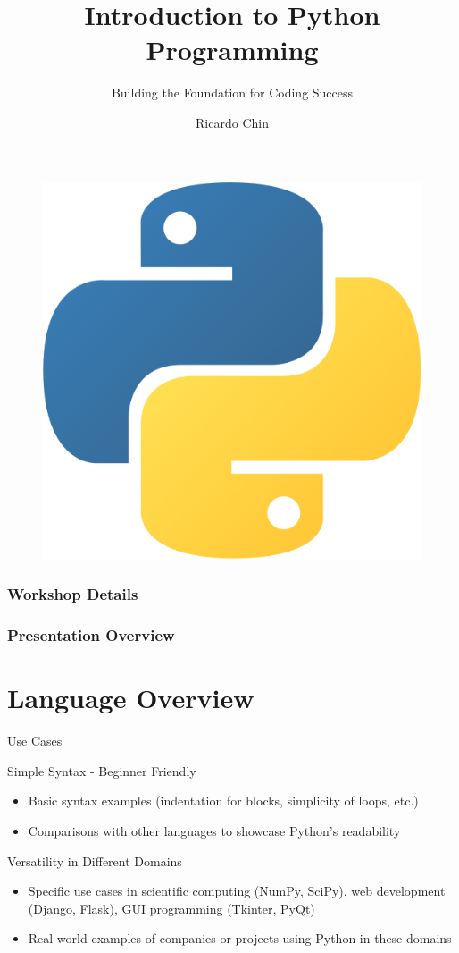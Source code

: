\documentclass[
	11pt, 
]{beamer}
\title[Python: Early Fundamentals]{Introduction to Python Programming}
\subtitle{Building the Foundation for Coding Success}
\author[Ricardo Chin]{Ricardo Chin}
\begin{document}
\begin{frame}
    \titlepage
    \begin{figure}
        \includegraphics[width=0.1\linewidth]{5848152fcef1014c0b5e4967}
    \end{figure}
    \frametitle{Workshop Details}
\end{frame}



\begin{frame}
	\frametitle{Presentation Overview}
	
	\tableofcontents
\end{frame}

\section{Language Overview}
\begin{frame}{Use Cases}
\begin{block}{Simple Syntax - Beginner Friendly}
\begin{itemize}
\item Basic syntax examples (indentation for blocks, simplicity of loops, etc.)
\item Comparisons with other languages to showcase Python's readability
\end{itemize}
\end{block}
\bigskip
\begin{block}{Versatility in Different Domains}
\begin{itemize}
\item Specific use cases in scientific computing (NumPy, SciPy), web development (Django, Flask), GUI programming (Tkinter, PyQt)
\item Real-world examples of companies or projects using Python in these domains
\end{itemize}
\end{block}

\end{frame}
\end{document}
